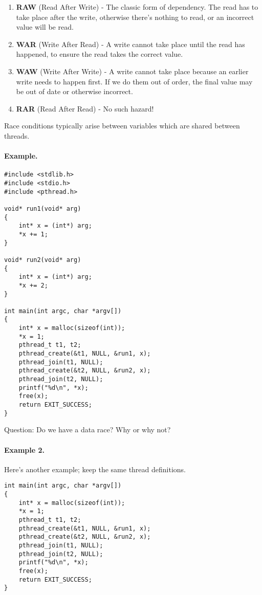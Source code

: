 \begin{enumerate}
	\item \textbf{RAW} (Read After Write) - The classic form of dependency. The read has to take place after the write, otherwise there's nothing to read, or an incorrect value will be read.
	\item \textbf{WAR} (Write After Read) - A write cannot take place until the read has happened, to ensure the read takes the correct value.
	\item \textbf{WAW} (Write After Write) - A write cannot take place because an earlier write needs to happen first. If we do them out of order, the final value may be out of date or otherwise incorrect.
	\item \textbf{RAR} (Read After Read) - No such hazard! 
\end{enumerate}


Race conditions typically arise between variables which are shared
between threads.

\paragraph{Example.}
\begin{verbatim}
#include <stdlib.h>
#include <stdio.h>
#include <pthread.h>

void* run1(void* arg)
{
    int* x = (int*) arg;
    *x += 1;
}

void* run2(void* arg)
{
    int* x = (int*) arg;
    *x += 2;
}

int main(int argc, char *argv[])
{
    int* x = malloc(sizeof(int));
    *x = 1;
    pthread_t t1, t2;
    pthread_create(&t1, NULL, &run1, x);
    pthread_join(t1, NULL);
    pthread_create(&t2, NULL, &run2, x);
    pthread_join(t2, NULL);
    printf("%d\n", *x);
    free(x);
    return EXIT_SUCCESS;
}
\end{verbatim}

\noindent
Question: Do we have a data race? Why or why not?
\vspace*{2em}

\paragraph{Example 2.} Here's another example; keep the same thread definitions.
\begin{verbatim}
int main(int argc, char *argv[])
{
    int* x = malloc(sizeof(int));
    *x = 1;
    pthread_t t1, t2;
    pthread_create(&t1, NULL, &run1, x);
    pthread_create(&t2, NULL, &run2, x);
    pthread_join(t1, NULL);
    pthread_join(t2, NULL);
    printf("%d\n", *x);
    free(x);
    return EXIT_SUCCESS;
}
\end{verbatim}

